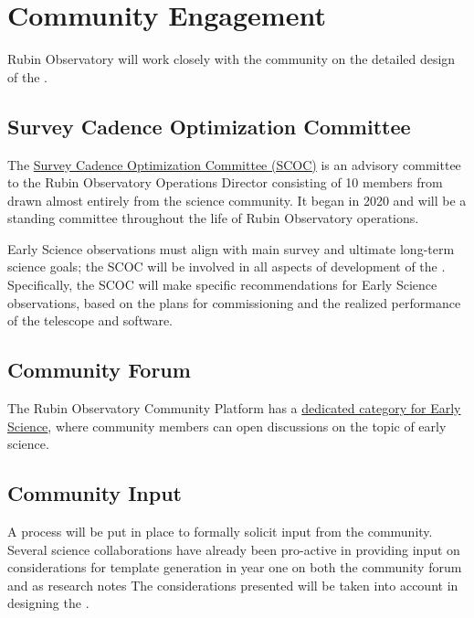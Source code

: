 \section{Community Engagement}

Rubin Observatory will work closely with the community on the detailed design of the \esp. 

\subsection{Survey Cadence Optimization Committee}
The \href{https://www.lsst.org/content/charge-survey-cadence-optimization-committee-scoc}{Survey Cadence Optimization Committee (SCOC)} is an advisory committee to the Rubin Observatory Operations Director consisting of 10 members from drawn almost entirely from the science community.
It began in 2020 and will be a standing committee throughout the life of Rubin Observatory operations. 

Early Science observations must align with main survey and ultimate long-term science goals; the SCOC will be involved in all aspects of development of the \esp. 
Specifically, the SCOC will make specific recommendations for Early Science observations, based on the plans for commissioning and the realized performance of the telescope and software. 


\subsection{Community Forum}

The Rubin Observatory Community Platform has a \href{https://community.lsst.org/t/about-the-early-science-category/5775}{dedicated category for Early Science}, where  community members can open discussions on the topic of early science. 

\subsection{Community Input}

A process will be put in place to formally solicit input from the community. 
Several science collaborations have already been pro-active in providing input on considerations for template generation in year one on both the community forum and as research notes
The considerations presented will be taken into account in designing the \esp. 